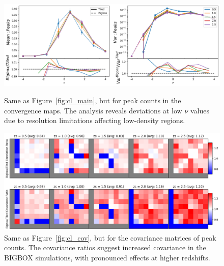 \begin{figure}[p]
    \centering
    \includegraphics[width=\textwidth]{figures/results/peaks_main.png}
    \caption{Same as Figure~\ref{fig:cl_main}, but for peak counts in the convergence maps. The analysis reveals deviations at low $\nu$ values due to resolution limitations affecting low-density regions.}
    \label{fig:peak_main}
    \vspace{2cm}
    \includegraphics[width=\textwidth]{figures/results/peaks_cov.png}
    \caption{Same as Figure~\ref{fig:cl_cov}, but for the covariance matrices of peak counts. The covariance ratios suggest increased covariance in the BIGBOX simulations, with pronounced effects at higher redshifts.}
    \label{fig:peak_cov}
\end{figure}

